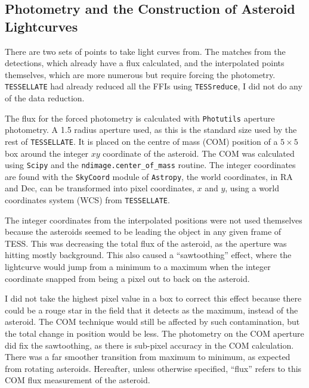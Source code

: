 \documentclass{UCreport}
\begin{document}
\subsection{Photometry and the Construction of Asteroid Lightcurves}\label{SubSec:Lightcurves}

There are two sets of points to take light curves from.
The matches from the detections, which already have a flux calculated, and the interpolated points themselves, which are more numerous but require forcing the photometry.
\texttt{TESSELLATE} had already reduced all the FFIs using \texttt{TESSreduce}, I did not do any of the data reduction.

The flux for the forced photometry is calculated with \texttt{Photutils} \citep{Bradley2024} aperture photometry.
A \qty{1.5}{\px} radius aperture used, as this is the standard size used by the rest of \texttt{TESSELLATE}.
It is placed on the centre of mass (COM) position of a $5\times5$ \unit{\px} box around the integer $xy$ coordinate of the asteroid.
The COM was calculated using \texttt{Scipy} and the \texttt{ndimage.center\_of\_mass} routine.
The integer coordinates are found with the \texttt{SkyCoord} module of \texttt{Astropy}, the world coordinates, in RA and Dec, can be transformed into pixel coordinates, $x$ and $y$, using a world coordinates system (WCS) from \texttt{TESSELLATE}.

The integer coordinates from the interpolated positions were not used themselves because the asteroids seemed to be leading the object in any given frame of TESS.
This was decreasing the total flux of the asteroid, as the aperture  was hitting mostly background.
This also caused a ``sawtoothing'' effect, where the lightcurve would jump from a minimum to a maximum when the integer coordinate snapped from being a pixel out to back on the asteroid.

I did not take the highest pixel value in a box to correct this effect because there could be a rouge star in the field that it detects as the maximum, instead of the asteroid.
The COM technique would still be affected by such contamination, but the total change in position would be less.
The photometry on the COM aperture did fix the sawtoothing, as there is sub-pixel accuracy in the COM calculation.
There was a far smoother transition from maximum to minimum, as expected from rotating asteroids.
Hereafter, unless otherwise specified, ``flux'' refers to this COM flux measurement of the asteroid.
\end{document}
